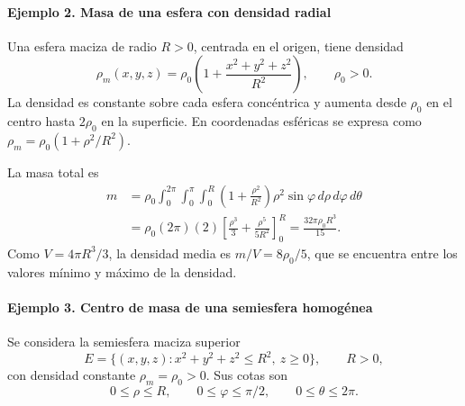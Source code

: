 \paragraph{Ejemplo 2. Masa de una esfera con densidad radial}

Una esfera maciza de radio $R>0$, centrada en el origen, tiene densidad
\[
\rho_m(x,y,z)=\rho_0\left(1+\frac{x^2+y^2+z^2}{R^2}\right),
\qquad \rho_0>0.
\]
La densidad es constante sobre cada esfera concéntrica y aumenta desde $\rho_0$ en el centro hasta $2\rho_0$ en la superficie. En coordenadas esféricas se expresa como $\rho_m=\rho_0(1+\rho^2/R^2)$.

\begingroup
\shorthandoff{>}
\begin{center}
\end{center}
\endgroup

La masa total es
\begin{align*}
m&=\rho_0\int_0^{2\pi}\int_0^\pi\int_0^R
\left(1+\frac{\rho^2}{R^2}\right)\rho^2\sin\varphi
\,d\rho\,d\varphi\,d\theta\\
&=\rho_0(2\pi)(2)
\left[\frac{\rho^3}{3}+\frac{\rho^5}{5R^2}\right]_0^R
=\frac{32\pi\rho_0R^3}{15}.
\end{align*}
Como $V=4\pi R^3/3$, la densidad media es $m/V=8\rho_0/5$, que se encuentra entre los valores mínimo y máximo de la densidad.

\paragraph{Ejemplo 3. Centro de masa de una semiesfera homogénea}

Se considera la semiesfera maciza superior
\[
E=\{(x,y,z):x^2+y^2+z^2\leq R^2,\ z\geq0\},
\qquad R>0,
\]
con densidad constante $\rho_m=\rho_0>0$. Sus cotas son
\[
0\leq\rho\leq R,\qquad 0\leq\varphi\leq\pi/2,
\qquad 0\leq\theta\leq2\pi.
\]

